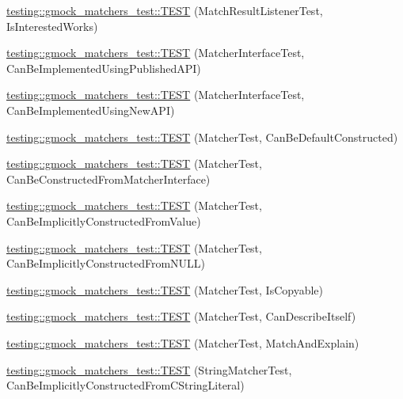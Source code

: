 \begin{DoxyCompactItemize}
\item 
\hyperlink{namespacetesting_1_1gmock__matchers__test_ac7ee3826ca24c20fa2a8b388c72eedb2}{testing\+::gmock\+\_\+matchers\+\_\+test\+::\+T\+E\+ST} (Match\+Result\+Listener\+Test, Is\+Interested\+Works)
\item 
\hyperlink{namespacetesting_1_1gmock__matchers__test_a2d73acaddb6b28a827ce0e475ffc9cde}{testing\+::gmock\+\_\+matchers\+\_\+test\+::\+T\+E\+ST} (Matcher\+Interface\+Test, Can\+Be\+Implemented\+Using\+Published\+A\+PI)
\item 
\hyperlink{namespacetesting_1_1gmock__matchers__test_ad212c5ac3ef7a102a6b1712e40e06a1e}{testing\+::gmock\+\_\+matchers\+\_\+test\+::\+T\+E\+ST} (Matcher\+Interface\+Test, Can\+Be\+Implemented\+Using\+New\+A\+PI)
\item 
\hyperlink{namespacetesting_1_1gmock__matchers__test_a8843a1545b9e09d73b565cf94f2e5f8b}{testing\+::gmock\+\_\+matchers\+\_\+test\+::\+T\+E\+ST} (Matcher\+Test, Can\+Be\+Default\+Constructed)
\item 
\hyperlink{namespacetesting_1_1gmock__matchers__test_a3dee288df7e811f817850a5187c42669}{testing\+::gmock\+\_\+matchers\+\_\+test\+::\+T\+E\+ST} (Matcher\+Test, Can\+Be\+Constructed\+From\+Matcher\+Interface)
\item 
\hyperlink{namespacetesting_1_1gmock__matchers__test_a2bd9ad37a8b9f03b10a15ed322c3249c}{testing\+::gmock\+\_\+matchers\+\_\+test\+::\+T\+E\+ST} (Matcher\+Test, Can\+Be\+Implicitly\+Constructed\+From\+Value)
\item 
\hyperlink{namespacetesting_1_1gmock__matchers__test_a0de94b029c8a13180276e411f4d75f7f}{testing\+::gmock\+\_\+matchers\+\_\+test\+::\+T\+E\+ST} (Matcher\+Test, Can\+Be\+Implicitly\+Constructed\+From\+N\+U\+LL)
\item 
\hyperlink{namespacetesting_1_1gmock__matchers__test_ab37bd0e535503a8f39e34b0554b2fb28}{testing\+::gmock\+\_\+matchers\+\_\+test\+::\+T\+E\+ST} (Matcher\+Test, Is\+Copyable)
\item 
\hyperlink{namespacetesting_1_1gmock__matchers__test_ae85f2ec21822e884ac9ff58741d420d2}{testing\+::gmock\+\_\+matchers\+\_\+test\+::\+T\+E\+ST} (Matcher\+Test, Can\+Describe\+Itself)
\item 
\hyperlink{namespacetesting_1_1gmock__matchers__test_aee6cef32b22ddd6ce8b87578c3de4198}{testing\+::gmock\+\_\+matchers\+\_\+test\+::\+T\+E\+ST} (Matcher\+Test, Match\+And\+Explain)
\item 
\hyperlink{namespacetesting_1_1gmock__matchers__test_a17fb479932a88dc4e334327c5e12c8d6}{testing\+::gmock\+\_\+matchers\+\_\+test\+::\+T\+E\+ST} (String\+Matcher\+Test, Can\+Be\+Implicitly\+Constructed\+From\+C\+String\+Literal)

\end{DoxyCompactItemize}

